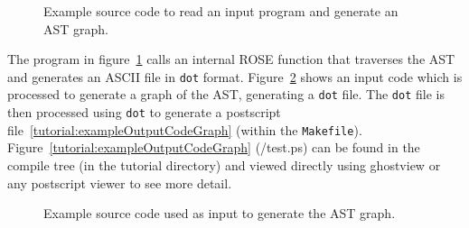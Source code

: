 \begin{figure}[!h]
{\indent
{\mySmallFontSize

\begin{latexonly}
   
\end{latexonly}

\begin{htmlonly}
   
\end{htmlonly}

}
}
\caption{Example source code to read an input program and generate an AST graph.}
\label{Tutorial:exampleASTGraphGenerator}
\end{figure}

The program in figure~\ref{Tutorial:exampleASTGraphGenerator} calls 
an internal ROSE function that traverses the AST and generates 
an ASCII file in {\tt dot} format.
Figure~\ref{Tutorial:exampleInputCode_ASTGraphGenerator} shows an input
code which is processed to generate a graph of the AST, generating a 
{\tt dot} file.   The {\tt dot} file is then processed
using {\tt dot} to generate a postscript file~\ref{tutorial:exampleOutputCodeGraph}
(within the {\tt Makefile}).
Figure~\ref{tutorial:exampleOutputCodeGraph}
(\TutorialExampleBuildDirectory/test.ps) can be found in the compile 
tree (in the tutorial directory) and viewed directly using ghostview 
or any postscript viewer to see more detail.


\begin{figure}[!h]
{\indent
{\mySmallFontSize

\begin{latexonly}
   
\end{latexonly}

\begin{htmlonly}
   
\end{htmlonly}

}
}
\caption{Example source code used as input to generate the AST graph.}
\label{Tutorial:exampleInputCode_ASTGraphGenerator}
\end{figure}


